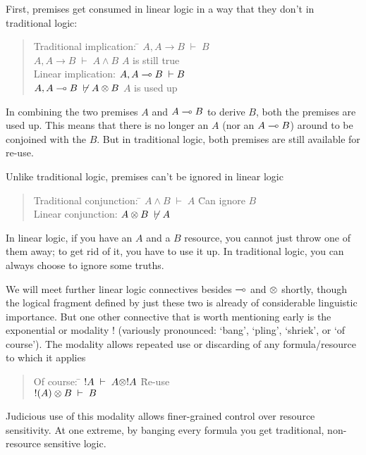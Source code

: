 First, premises get consumed in linear logic in a way that they don't
in traditional logic:
\begin{quote}
\begin{tabbing}
Traditional implication: \=
             $A, A\rightarrow B \; \vdash \; B$\\
          \> $A, A\rightarrow B \; \vdash \; A\wedge B$
 \hspace*{5em}\= {\small $A$ is still true}\\[1ex]
 
Linear implication: \>
                     $A, A\multimap B \; \vdash B$\\
                    \> $A, A\multimap B \; \not\vdash A\otimes B$ 
                      \> {\small $A$ is used up}
\end{tabbing}
\end{quote}
In combining the two premises $A$ and $A\multimap B$ to derive $B$, both
the premises are used up.  This means that there is no longer an $A$
(nor an $A\multimap B$) around to be conjoined with the $B$.  But
in traditional logic, both premises are still available for re-use.

Unlike traditional logic, premises can't be ignored in linear
logic
\begin{quote}
\begin{tabbing}
Traditional conjunction: \= $A\wedge B \; \vdash \;
A$ \hspace*{6.5em}\={\small Can ignore $B$}\\[1ex]
Linear conjunction:\> $A\otimes B \; \not\vdash A$
\end{tabbing}
\end{quote}
In linear logic, if you have an $A$ and a $B$ resource, you cannot
just throw one of them away; to get rid of it, you have to use it up.
In traditional logic, you can always choose to ignore some truths.


We will meet further linear logic connectives besides $\multimap$ and
$\otimes$ shortly, though the logical fragment defined by just these
two is already of considerable linguistic importance.  But one other
connective that is worth mentioning early is the exponential or modality !
(variously pronounced: `bang', `pling', `shriek', or `of course').  
The modality
allows repeated use or discarding of any formula/resource to which it
applies
\begin{quote}
\begin{tabbing}
Of course: \= $!A \; \vdash \; A\otimes !A$ \hspace*{5em}\={\small Re-use}\\
           \> $!(A)\otimes B \; \vdash \; B$ 
\end{tabbing}
\end{quote}
Judicious use of this modality allows finer-grained control over
resource sensitivity.  At one extreme, by banging every formula you
get traditional, non-resource sensitive logic.



